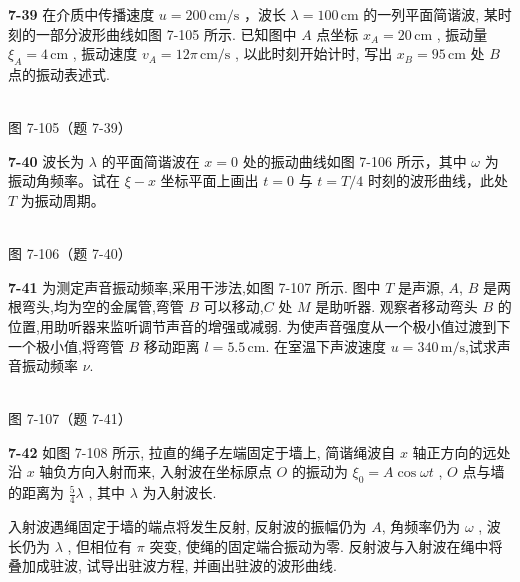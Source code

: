 \newpage

\textbf{7-39} 在介质中传播速度 $u=200\,\mathrm{cm/s}$ ，波长 $\lambda=100\,\mathrm{cm}$ 的一列平面简谐波, 某时刻的一部分波形曲线如图 7-105 所示. 已知图中 $A$ 点坐标 $x_{A}=20\,\mathrm{cm}$ , 振动量 $\xi_{A}=4\,\mathrm{cm}$ , 振动速度 $v_{A}=12\pi\,\mathrm{cm/s}$ , 以此时刻开始计时, 写出 $x_{B}=95\,\mathrm{cm}$ 处 $B$ 点的振动表述式.

\begin{center}
\resizebox{0.50\textwidth}{!}{}\\[4pt]
{\small 图 7-105（题 7-39）}
\end{center}

\newpage

\textbf{7-40} 波长为 $\lambda$ 的平面简谐波在 $x=0$ 处的振动曲线如图 7-106 所示，其中 $\omega$ 为振动角频率。试在 $\xi-x$ 坐标平面上画出 $t=0$ 与 $t=T/4$ 时刻的波形曲线，此处 $T$ 为振动周期。

\begin{center}
\resizebox{0.50\textwidth}{!}{}\\[4pt]
{\small 图 7-106（题 7-40）}
\end{center}

\newpage

\textbf{7-41} 为测定声音振动频率,采用干涉法,如图 7-107 所示. 图中 $T$ 是声源, $A$, $B$ 是两根弯头,均为空的金属管,弯管 $B$ 可以移动,$C$ 处 $M$ 是助听器. 观察者移动弯头 $B$ 的位置,用助听器来监听调节声音的增强或减弱. 为使声音强度从一个极小值过渡到下一个极小值,将弯管 $B$ 移动距离 $l=5.5\,\mathrm{cm}$. 在室温下声波速度 $u=340\,\mathrm{m/s}$,试求声音振动频率 $\nu$.

\begin{center}
\resizebox{0.50\textwidth}{!}{}\\[4pt]
{\small 图 7-107（题 7-41）}
\end{center}

\newpage

\textbf{7-42} 如图 7-108 所示, 拉直的绳子左端固定于墙上, 简谐绳波自 $x$ 轴正方向的远处沿 $x$ 轴负方向入射而来, 入射波在坐标原点 $O$ 的振动为 $\xi_{0}=A\cos\omega t$ , $O$ 点与墙的距离为 $\frac{5}{4}\lambda$ , 其中 $\lambda$ 为入射波长.

入射波遇绳固定于墙的端点将发生反射, 反射波的振幅仍为 $A$, 角频率仍为 $\omega$ , 波长仍为 $\lambda$ , 但相位有 $\pi$ 突变, 使绳的固定端合振动为零. 反射波与入射波在绳中将叠加成驻波, 试导出驻波方程, 并画出驻波的波形曲线.

